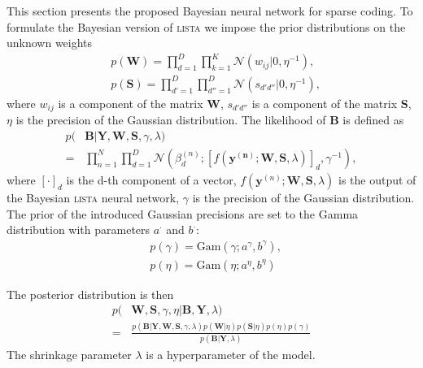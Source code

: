\documentclass[letterpaper]{article}
\begin{document}
This section presents the proposed Bayesian neural network for sparse coding. To formulate the Bayesian version of \textsc{lista} we impose the prior distributions on the unknown weights
\begin{align}
&p(\mathbf{W}) = \prod_{d=1}^D\prod_{k=1}^K \mathcal{N}(w_{ij} | 0, \eta^{-1}), \\
&p(\mathbf{S}) = \prod_{d'=1}^D\prod_{d''=1}^D \mathcal{N}(s_{d'd''} | 0, \eta^{-1}),
\end{align}
where $w_{ij}$ is a component of the matrix $\mathbf{W}$, $s_{d'd''}$ is a component of the matrix $\mathbf{S}$, $\eta$ is the precision of the Gaussian distribution.
The likelihood of $\mathbf{B}$ is defined as 
\begin{align}
p(&\mathbf{B}| \mathbf{Y}, \mathbf{W}, \mathbf{S}, \gamma, \lambda) \nonumber \\
\label{eq:likelihood}
= &\prod_{n=1}^N\prod_{d=1}^D\mathcal{N}(\beta_d^{(n)}; [f(\mathbf{y^{(n)}}; \mathbf{W}, \mathbf{S}, \lambda)]_d, \gamma^{-1}),
\end{align}
where $[\cdot]_d$ is the d-th component of a vector, $f(\mathbf{y}^{(n)}; \mathbf{W}, \mathbf{S}, \lambda)$ is the output of the Bayesian \textsc{lista} neural network, $\gamma$ is the precision of the Gaussian distribution.
The prior of the introduced Gaussian precisions are set to the Gamma distribution with parameters $a^{\cdot}$ and $b^{\cdot}$:
\begin{align}
&p(\gamma) = \text{Gam}\left(\gamma; a^{\gamma}, b^{\gamma}\right), \\
&p(\eta) = \text{Gam}\left(\eta; 	a^{\eta}, b^{\eta}\right)
\end{align}

The posterior distribution is then
\begin{align}
p(&\mathbf{W}, \mathbf{S}, \gamma, \eta | \mathbf{B}, \mathbf{Y}, \lambda) \nonumber \\
\label{eq:posterior}
= & \frac{p(\mathbf{B} | \mathbf{Y}, \mathbf{W},  \mathbf{S}, \gamma, \lambda) p(\mathbf{W} | \eta )p(\mathbf{S} | \eta) p(\eta) p(\gamma)}{p(\mathbf{B} | \mathbf{Y}, \lambda)}
\end{align}
The shrinkage parameter $\lambda$ is a hyperparameter of the model.
\end{document}
